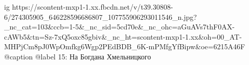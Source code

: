  
 
 
 
 

\ifcmt
  ig https://scontent-mxp1-1.xx.fbcdn.net/v/t39.30808-6/274305905_646228596686807_107755906293011546_n.jpg?_nc_cat=103&ccb=1-5&_nc_sid=5cd70e&_nc_ohc=aGuAVs7thF0AX-cAWb5&tn=Sz-7xQ5oxc85gbiv&_nc_ht=scontent-mxp1-1.xx&oh=00_AT-MHPjCm8pJ0WpOmfkg6Wgp2PEdBDB_6K-mPMfgYfBipw&oe=6215A46F
  @caption @label 15: На Богдана Хмельницкого
\fi
